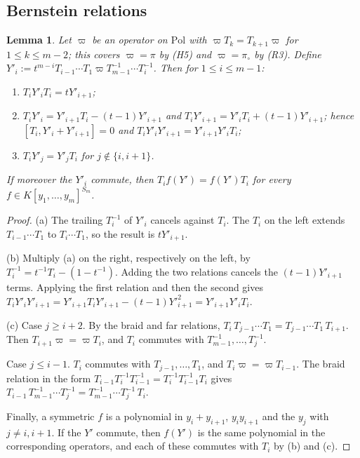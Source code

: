\documentclass[11pt]{amsart}
\newtheorem{lemma}[theorem]{Lemma}
\theoremstyle{definition}
\theoremstyle{remark}
\numberwithin{equation}{section}
\begin{document}
\subsection{Bernstein relations}
\begin{lemma}\label{lem:bernstein}
Let $\varpi$ be an operator on $\mathrm{Pol}$ with $\varpi T_k=T_{k+1}\varpi$ for $1\le k\le m-2$; this covers $\varpi=\pi$ by (H5) and $\varpi=\pi_\circ$ by (R3). Define $Y'_i:=t^{m-i}T_{i-1}\cdots T_1\varpi T_{m-1}^{-1}\cdots T_i^{-1}$. Then for $1\le i\le m-1$:
\begin{enumerate}
\item[(a)] $T_iY'_iT_i=tY'_{i+1}$;
\item[(b)] $T_iY'_i=Y'_{i+1}T_i-(t-1)Y'_{i+1}$ and $T_iY'_{i+1}=Y'_iT_i+(t-1)Y'_{i+1}$; hence $[T_i,Y'_i+Y'_{i+1}]=0$ and $T_iY'_iY'_{i+1}=Y'_{i+1}Y'_iT_i$;
\item[(c)] $T_iY'_j=Y'_jT_i$ for $j\notin\{i,i+1\}$.
\end{enumerate}
If moreover the $Y'_i$ commute, then $T_if(Y')=f(Y')T_i$ for every $f\in K[y_1,\dots,y_m]^{S_m}$.
\end{lemma}
\begin{proof}
(a) The trailing $T_i^{-1}$ of $Y'_i$ cancels against $T_i$. The $T_i$ on the left extends $T_{i-1}\cdots T_1$ to $T_i\cdots T_1$, so the result is $tY'_{i+1}$.

(b) Multiply (a) on the right, respectively on the left, by $T_i^{-1}=t^{-1}T_i-(1-t^{-1})$. Adding the two relations cancels the $(t-1)Y'_{i+1}$ terms. Applying the first relation and then the second gives $T_iY'_iY'_{i+1}=Y'_{i+1}T_iY'_{i+1}-(t-1)Y'^2_{i+1}=Y'_{i+1}Y'_iT_i$.

(c) Case $j\ge i+2$. By the braid and far relations, $T_i\,T_{j-1}\cdots T_1=T_{j-1}\cdots T_1\,T_{i+1}$. Then $T_{i+1}\varpi=\varpi T_i$, and $T_i$ commutes with $T_{m-1}^{-1},\dots,T_j^{-1}$.

Case $j\le i-1$. $T_i$ commutes with $T_{j-1},\dots,T_1$, and $T_i\varpi=\varpi T_{i-1}$. The braid relation in the form $T_{i-1}T_i^{-1}T_{i-1}^{-1}=T_i^{-1}T_{i-1}^{-1}T_i$ gives $T_{i-1}\,T_{m-1}^{-1}\cdots T_j^{-1}=T_{m-1}^{-1}\cdots T_j^{-1}\,T_i$.

Finally, a symmetric $f$ is a polynomial in $y_i+y_{i+1}$, $y_iy_{i+1}$ and the $y_j$ with $j\ne i,i+1$. If the $Y'$ commute, then $f(Y')$ is the same polynomial in the corresponding operators, and each of these commutes with $T_i$ by (b) and (c).
\end{proof}
\end{document}
